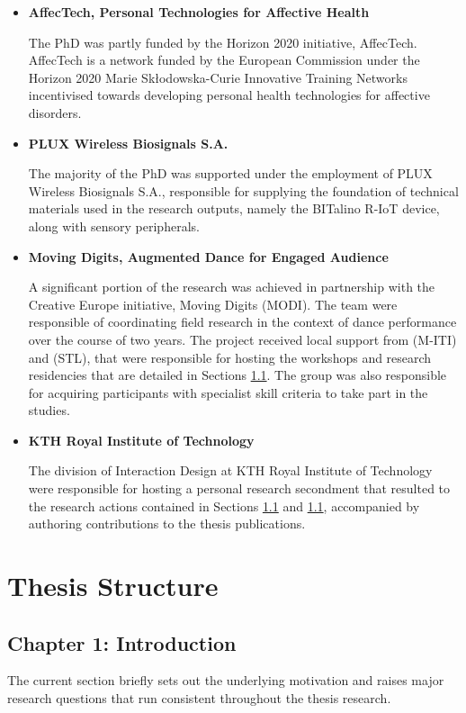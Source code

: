 \begin{itemize}
    \item \textbf{AffecTech, Personal Technologies for Affective Health}
    
        The PhD was partly funded by the Horizon 2020 initiative, AffecTech. AffecTech is a network funded by the European Commission under the Horizon 2020 Marie Skłodowska-Curie Innovative Training Networks incentivised towards developing personal health technologies for affective disorders.
    
    \item \textbf{PLUX Wireless Biosignals S.A.}
    
        The majority of the PhD was supported under the employment of PLUX Wireless Biosignals S.A., responsible for supplying the foundation of technical materials used in the research outputs, namely the BITalino R-IoT device, along with sensory peripherals.
        
    \item \textbf{Moving Digits, Augmented Dance for Engaged Audience}
    
        A significant portion of the research was achieved in partnership with the Creative Europe initiative, Moving Digits (MODI). The team were responsible of coordinating field research in the context of dance performance over the course of two years. The project received local support from (M-ITI) and (STL), that were responsible for hosting the workshops and research residencies that are detailed in Sections \ref{}. The group was also responsible for acquiring participants with specialist skill criteria to take part in the studies.
        
    \item \textbf{KTH Royal Institute of Technology}
        
        The division of Interaction Design at KTH Royal Institute of Technology were responsible for hosting a personal research secondment that resulted to the research actions contained in Sections \ref{} and \ref{}, accompanied by authoring contributions to the thesis publications.
\end{itemize}

\section{Thesis Structure}
\label{sec:structure}

\subsection{Chapter 1: Introduction}
The current section briefly sets out the underlying motivation and raises major research questions that run consistent throughout the thesis research.

